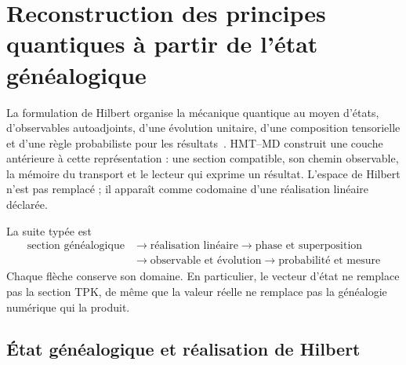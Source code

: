 \section{Reconstruction des principes quantiques à partir de l’état généalogique}
\label{v:rec:sec:postulados-cuanticos-genealogicos-rev2}

La formulation de Hilbert organise la mécanique quantique au moyen d’états,
d’observables autoadjoints, d’une évolution unitaire, d’une composition tensorielle et d’une
règle probabiliste pour les résultats~\cite{vonNeumann1932}. HMT--MD
construit une couche antérieure à cette représentation : une section compatible,
son chemin observable, la mémoire du transport et le lecteur qui exprime un
résultat. L’espace de Hilbert n’est pas remplacé ; il apparaît comme codomaine d’une
réalisation linéaire déclarée.

La suite typée est
\[
 \boxed{\begin{aligned}
 \text{section généalogique}
 &\longrightarrow \text{réalisation linéaire}
 \longrightarrow \text{phase et superposition}\\
 &\longrightarrow \text{observable et évolution}
 \longrightarrow \text{probabilité et mesure}
 \end{aligned}}
\]
Chaque flèche conserve son domaine. En particulier, le vecteur d’état ne
remplace pas la section TPK, de même que la valeur réelle ne remplace pas
la généalogie numérique qui la produit.

\subsection{État généalogique et réalisation de Hilbert}
\label{v:rec:realizacion_evolucion:section:02}

